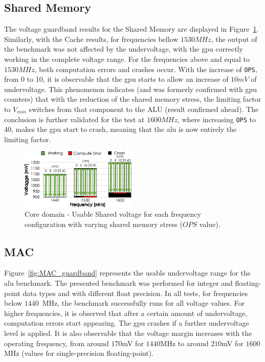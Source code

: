 \subsection{Shared Memory}

\label{sec:cache_guardband}

The voltage guardband results for the Shared Memory are displayed in Figure~\ref{fig:SharedMemory_guardband}. Similarly, with the Cache results, for frequencies bellow $1530MHz$, the output of the benchmark was not affected by the undervoltage, with the \acrshort{gpu} correctly working in the complete voltage range. For the frequencies above and equal to $1530MHz$, both computation errors and crashes occur. With the increase of \texttt{OPS}, from 0 to 10, it is observable that the \acrshort{gpu} starts to allow an increase of $10mV$ of undervoltage. This phenomenon indicates (and was formerly confirmed with \acrshort{gpu} counters) that with the reduction of the shared memory stress, the limiting factor to $V_{min}$ switches from that component to the ALU (result confirmed ahead). The conclusion is further validated for the test at $1600MHz$, where increasing  \texttt{OPS} to 40, makes the \acrshort{gpu} start to crash, meaning that the \acrshort{alu} is now entirely the limiting factor.

\begin{figure}[htb]
  \centering
  \includegraphics[width=0.5\textwidth]{Figures/GPU_characterization/SharedMemory_guardband.pdf}
  \caption{Core domain - Usable Shared voltage for each frequency configuration with varying shared memory stress ($OPS$ value).}
  \label{fig:SharedMemory_guardband}
\end{figure}

\subsection{MAC}

Figure~\ref{fig:MAC_guardband} represents the usable undervoltage range for the \acrshort{alu} benchmark. The presented benchmark was performed for integer and floating-point data types and with different float precision. In all tests, for frequencies below $1440$~MHz, the benchmark successfully runs for all voltage values. For higher frequencies, it is observed that after a certain amount of undervoltage, computation errors start appearing. The \acrshort{gpu} crashes if a further undervoltage level is applied. 
It is also observable that the voltage margin increases with the operating frequency, from around $170$mV for $1440$MHz to around $210$mV for $1600$MHz (values for single-precision floating-point).

